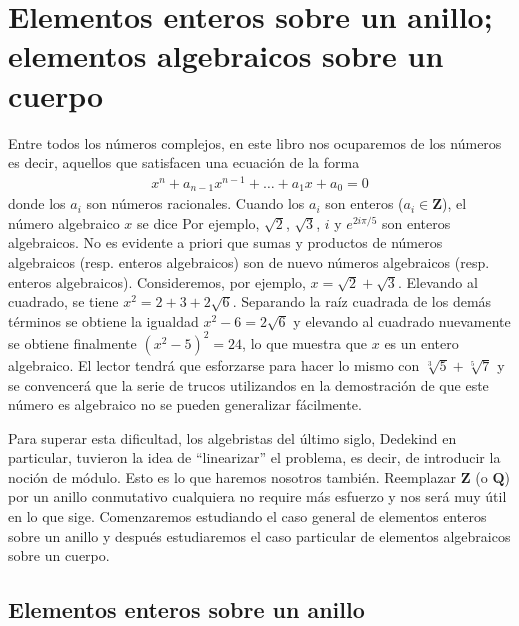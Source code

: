 \documentclass[bibtotoc,leqno,spanish]{amsbook}
\let\emph\relax %
\newcommand{\QQ}{\mathbf{Q}}
\newcommand{\ZZ}{\mathbf{Z}}
\numberwithin{equation}{section}
\theoremstyle{note}
\theoremstyle{note}
\theoremstyle{rem}
\numberwithin{theorem}{section}
\numberwithin{proposition}{section}
\numberwithin{definition}{section}
\numberwithin{lemma}{section}
\numberwithin{corollary}{section}
\numberwithin{example}{section}
\numberwithin{footnote}{section}%
\begin{document}
\chapter[Elementos enteros sobre un anillo]
{Elementos enteros sobre un anillo; elementos algebraicos sobre un cuerpo}
\label{cap2}

Entre todos los n\'umeros complejos, en este libro nos ocuparemos de los n\'umeros
\emph{algebraicos,} es decir, aquellos que satisfacen una ecuaci\'on de la forma
\begin{gather*}
x^{n}+a_{n-1}x^{n-1}+\dots+a_{1}x+a_{0} = 0
\end{gather*}
donde los $a_{i}$ son n\'umeros racionales. Cuando los $a_{i}$ son enteros
($a_{i}\in\ZZ$), el n\'umero algebraico $x$ se dice \emph{entero algebraico.}
Por ejemplo, $\sqrt{2}$, $\sqrt{3}$, $i$ y $e^{2i\pi/5}$ son enteros algebraicos. No es evidente
a priori que sumas y productos de n\'umeros algebraicos (resp. enteros algebraicos) son
de nuevo n\'umeros algebraicos (resp. enteros algebraicos). Consideremos, por ejemplo,
$x = \sqrt{2}+\sqrt{3}$. Elevando al cuadrado, se tiene $x^{2} = 2+3+2\sqrt{6}$.
Separando la ra\'iz cuadrada de los dem\'as t\'erminos se obtiene la igualdad $x^{2}-6=2\sqrt{6}$ y
elevando al cuadrado nuevamente se obtiene finalmente $(x^{2}-5)^{2}=24$, lo que muestra que
$x$ es un entero algebraico. El lector tendr\'a que esforzarse para hacer lo mismo con
$\sqrt[3]{5}+\sqrt[5]{7}$ y se convencer\'a que la serie de trucos utilizandos en la demostraci\'on de
que este n\'umero es algebraico no se pueden generalizar f\'acilmente.

Para superar esta dificultad, los algebristas del \'ultimo siglo, Dedekind en particular, tuvieron
la idea de ``linearizar'' el problema, es decir, de introducir la noci\'on de m\'odulo. Esto es lo que haremos nosotros
tambi\'en. Reemplazar $\ZZ$ (o $\QQ$) por un anillo conmutativo cualquiera no require m\'as esfuerzo
y nos ser\'a muy \'util en lo que sige. Comenzaremos estudiando el caso general de elementos enteros sobre un
anillo y despu\'es estudiaremos el caso particular de elementos algebraicos sobre un cuerpo.

\section{Elementos enteros sobre un anillo}\label{sec2.1}
\end{document}
